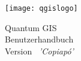 
\begin{titlepage}
\begin{center}

\begin{center}
\texttt{[image: qgislogo]} 
\end{center}

\Huge{Quantum GIS}\\
\vspace{0.5cm}
\Large{Benutzerhandbuch} \\
\vspace{0.5cm}
\Large{Version ~\CURRENT \textsl{'Copiap\'{o}'}}

\end{center}
\end{titlepage}
